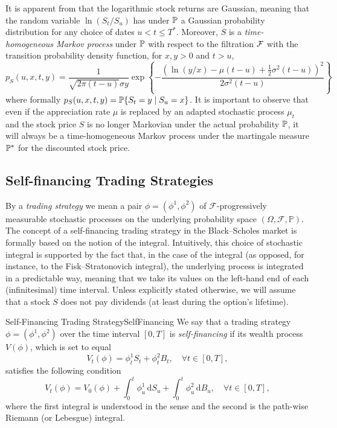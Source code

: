 It is apparent from  that the logarithmic stock returns are Gaussian, meaning that the random variable \(\ln(S_t/S_u)\) has under \(\mathbb{P}\) a Gaussian probability distribution for any choice of dates \(u < t \le T^*\). Moreover, \(S\) is a \emph{time-homogeneous Markov process} under \(\mathbb{P}\) with respect to the filtration \(\mathcal{F}\) with the transition probability density function, for \(x, y > 0\) and \(t > u\),
\begin{equation} \label{eq:GBMTransitionDensity}
	p_S(u, x, t, y) = \frac{1}{\sqrt{2\pi (t-u)} \sigma y} \exp \left\{ - \frac{\left( \ln(y/x) - \mu(t-u) + \frac{1}{2}\sigma^2(t-u) \right)^2}{2\sigma^2(t-u)} \right\}
\end{equation}
where formally \(p_S(u, x, t, y) = \mathbb{P} \{S_t = y \mid S_u = x\}\). It is important to observe that even if the appreciation rate \(\mu\) is replaced by an adapted stochastic process \(\mu_t\) and the stock price \(S\) is no longer Markovian under the actual probability \(\mathbb{P}\), it will always be a time-homogeneous Markov process under the martingale measure \(\mathbb{P}^*\) for the discounted stock price.

\subsection{Self-financing Trading Strategies}
By a \textit{trading strategy} we mean a pair \(\phi = (\phi^1, \phi^2)\) of \(\mathcal{F}\)-progressively measurable stochastic processes on the underlying probability space \((\Omega, \mathcal{F}, \mathbb{P})\). The concept of a self-financing trading strategy in the Black–Scholes market is formally based on the notion of the \Ito{} integral. Intuitively, this choice of stochastic integral is supported by the fact that, in the case of the \Ito{} integral (as opposed, for instance, to the Fisk–Stratonovich integral), the underlying process is integrated in a predictable way, meaning that we take its values on the left-hand end of each (infinitesimal) time interval. Unless explicitly stated otherwise, we will assume that a stock \(S\) does not pay dividends (at least during the option's lifetime).

\begin{defn}{Self-Financing Trading Strategy}{SelfFinancing}
	We say that a trading strategy \(\phi = (\phi^1, \phi^2)\) over the time interval \([0, T]\) is \textit{self-financing} if its wealth process \(V(\phi)\), which is set to equal
	\begin{equation}
		V_t(\phi) = \phi^1_t S_t + \phi^2_t B_t, \quad \forall t \in [0, T],
		\label{eq:WealthProcess}
	\end{equation}
	satisfies the following condition
	\begin{equation}
		V_t(\phi) = V_0(\phi) + \int_0^t \phi^1_u \, \mathrm{d} S_u + \int_0^t \phi^2_u \, \mathrm{d} B_u, \quad \forall t \in [0, T],
		\label{eq:SelfFinancingCondition}
	\end{equation}
	where the first integral is understood in the \Ito{} sense and the second is the path-wise Riemann (or Lebesgue) integral.
\end{defn}

